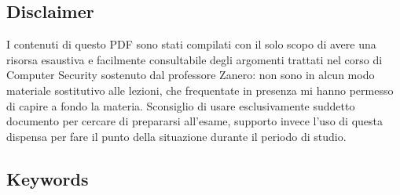 \subsection{Disclaimer}
I contenuti di questo PDF sono stati compilati con il solo scopo di avere una 
risorsa esaustiva e facilmente consultabile degli argomenti trattati nel corso 
di Computer Security sostenuto dal professore Zanero: non sono in 
alcun modo materiale sostitutivo alle lezioni, che frequentate in presenza mi 
hanno permesso di capire a fondo la materia. Sconsiglio di usare esclusivamente 
suddetto documento per cercare di prepararsi all'esame, supporto invece l'uso 
di questa dispensa per fare il punto della situazione durante il periodo 
di studio.
\subsection{Keywords}